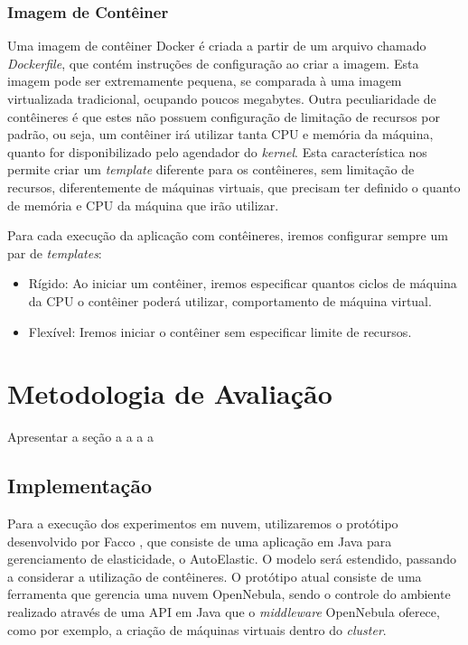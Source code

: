 \documentclass[twoside,english,brazilian]{UNISINOSartigo}
\begin{document}
\subsubsection{Imagem de Contêiner}
Uma imagem de contêiner Docker é criada a partir de um arquivo chamado \textit{Dockerfile}, que contém instruções de configuração ao criar a imagem. Esta imagem pode ser extremamente pequena, se comparada à uma imagem virtualizada tradicional, ocupando poucos megabytes. Outra peculiaridade de contêineres é que estes não possuem configuração de limitação de recursos por padrão, ou seja, um contêiner irá utilizar tanta CPU e memória da máquina, quanto for disponibilizado pelo agendador do \textit{kernel}. Esta característica nos permite criar um \textit{template} diferente para os contêineres, sem limitação de recursos, diferentemente de máquinas virtuais, que precisam ter definido o quanto de memória e CPU da máquina que irão utilizar. 

Para cada execução da aplicação com contêineres, iremos configurar sempre um par de \textit{templates}:
\begin{itemize}
	\item Rígido: Ao iniciar um contêiner, iremos especificar quantos ciclos de máquina da CPU o contêiner poderá utilizar, comportamento de máquina virtual.
	\item Flexível: Iremos iniciar o contêiner sem especificar limite de recursos.
\end{itemize} 

\section{Metodologia de Avaliação}
Apresentar a seção
a
a
a
a

\subsection{Implementação}
\label{prototype}

Para a execução dos experimentos em nuvem, utilizaremos o protótipo desenvolvido por Facco , que consiste de uma aplicação em Java para gerenciamento de elasticidade, o AutoElastic. O modelo será estendido, passando a considerar a utilização de contêineres. O protótipo atual consiste de uma ferramenta que gerencia uma nuvem OpenNebula, sendo o controle do ambiente realizado através de uma API em Java que o \textit{middleware} OpenNebula oferece, como por exemplo, a criação de máquinas virtuais dentro do \textit{cluster}. 
\end{document}
